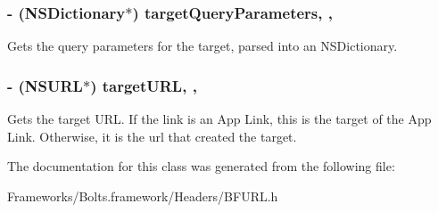 \subsubsection[{target\+Query\+Parameters}]{\setlength{\rightskip}{0pt plus 5cm}-\/ (N\+S\+Dictionary$\ast$) target\+Query\+Parameters\hspace{0.3cm}{\ttfamily [read]}, {\ttfamily [nonatomic]}, {\ttfamily [strong]}}\label{interface_b_f_u_r_l_a874bc9b6e197567616676e7c35882312}
Gets the query parameters for the target, parsed into an N\+S\+Dictionary. \hypertarget{interface_b_f_u_r_l_aa83698fb8e97cde89f07f2a27dd453b9}{}
\subsubsection[{target\+U\+R\+L}]{\setlength{\rightskip}{0pt plus 5cm}-\/ (N\+S\+U\+R\+L$\ast$) target\+U\+R\+L\hspace{0.3cm}{\ttfamily [read]}, {\ttfamily [nonatomic]}, {\ttfamily [strong]}}\label{interface_b_f_u_r_l_aa83698fb8e97cde89f07f2a27dd453b9}
Gets the target U\+R\+L. If the link is an App Link, this is the target of the App Link. Otherwise, it is the url that created the target. 

The documentation for this class was generated from the following file\+:\begin{DoxyCompactItemize}
\item 
Frameworks/\+Bolts.\+framework/\+Headers/B\+F\+U\+R\+L.\+h\end{DoxyCompactItemize}

